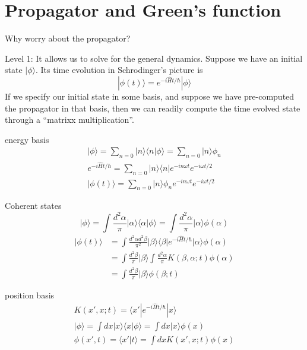 \section{Propagator and Green's function}

Why worry about the propagator?

Level 1: It allows us to solve for the general dynamics. Suppose we have an initial state $|\phi\rangle$. Its time evolution in Schrodinger's picture is
\[ |\phi \left( t \right) \rangle =e^{-i\hat{H}t/\hbar}|\phi \rangle \]
If we specify our initial state in some basis, and suppose we have pre-computed the propagator in that basis, then we can readily compute the time evolved state through a ``matrixx multiplication''.

energy basis
\begin{gather*}
    |\phi \rangle =\sum_{n=0}{|n\rangle \langle n|\phi \rangle}=\sum_{n=0}{|n\rangle \phi _n}\\
    e^{-i\hat{H}t/\hbar}=\sum_{n=0}{|n\rangle \langle n|e^{-in\omega t}e^{-i\omega t/2}}\\
    |\phi \left( t \right) \rangle =\sum_{n=0}{|n\rangle \phi _ne^{-in\omega t}e^{-i\omega t/2}}
\end{gather*}

Coherent states
\[ |\phi \rangle =\int{\frac{d^2\alpha}{\pi}|\alpha \rangle \langle \alpha |\phi \rangle}=\int{\frac{d^2\alpha}{\pi}|\alpha \rangle \phi \left( \alpha \right)}\]
\begin{align*}
    |\phi \left( t \right) \rangle &=\int{\frac{d^2\alpha d^2\beta}{\pi ^2}|\beta \rangle \langle \beta |e^{-i\hat{H}t/\hbar}|\alpha \rangle \phi \left( \alpha \right)}\\
    &=\int{\frac{d^2\beta}{\pi}|\beta \rangle \int{\frac{d^2\alpha}{\pi}K\left( \beta ,\alpha ;t \right) \phi \left( \alpha \right)}}\\
    &=\int{\frac{d^2\beta}{\pi}|\beta \rangle \phi \left( \beta ;t \right)}
\end{align*}

position basis
\begin{gather*}
    K\left( x',x;t \right) =\langle x'|e^{-i\hat{H}t/\hbar}|x\rangle \\
    |\phi \rangle =\int{dx|x\rangle \langle x|\phi \rangle}=\int{dx|x\rangle \phi \left( x \right)}\\
    \phi \left( x',t \right) =\langle x'|t\rangle =\int{dxK\left( x',x;t \right) \phi \left( x \right)}
\end{gather*}

